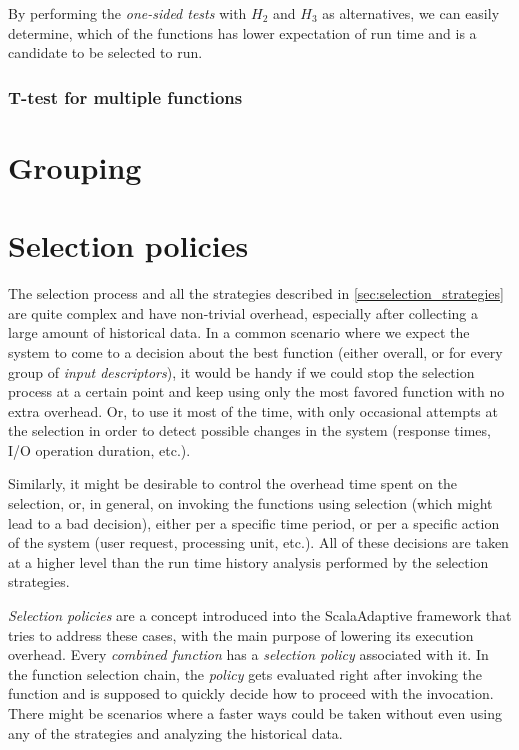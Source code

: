 By performing the \textit{one-sided tests} with $H_2$ and $H_3$ as alternatives, we can easily determine, which of the functions has lower expectation of run time and is a candidate to be selected to run.

\subsubsection{T-test for multiple functions}

\section{Grouping}

\section{Selection policies}

The selection process and all the strategies described in \ref{sec:selection_strategies} are quite complex and have non-trivial overhead, especially after collecting a large amount of historical data. In a common scenario where we expect the system to come to a decision about the best function (either overall, or for every group of \textit{input descriptors}), it would be handy if we could stop the selection process at a certain point and keep using only the most favored function with no extra overhead. Or, to use it most of the time, with only occasional attempts at the selection in order to detect possible changes in the system (response times, I/O operation duration, etc.).

Similarly, it might be desirable to control the overhead time spent on the selection, or, in general, on invoking the functions using selection (which might lead to a bad decision), either per a specific time period, or per a specific action of the system (user request, processing unit, etc.). All of these decisions are taken at a higher level than the run time history analysis performed by the selection strategies.  

\textit{Selection policies} are a concept introduced into the ScalaAdaptive framework that tries to address these cases, with the main purpose of lowering its execution overhead. Every \textit{combined function} has a \textit{selection policy} associated with it. In the function selection chain, the \textit{policy} gets evaluated right after invoking the function and is supposed to quickly decide how to proceed with the invocation. There might be scenarios where a faster ways could be taken without even using any of the strategies and analyzing the historical data.

